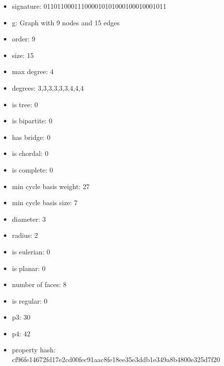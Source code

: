 \begin{figure}
\end{figure}
\begin{itemize}
\item signature: 011011000111000010101000100010001011
\item g: Graph with 9 nodes and 15 edges
\item order: 9
\item size: 15
\item max degree: 4
\item degrees: 3,3,3,3,3,3,4,4,4
\item is tree: 0
\item is bipartite: 0
\item has bridge: 0
\item is chordal: 0
\item is complete: 0
\item min cycle basis weight: 27
\item min cycle basis size: 7
\item diameter: 3
\item radius: 2
\item is eulerian: 0
\item is planar: 0
\item number of faces: 8
\item is regular: 0
\item p3: 30
\item p4: 42
\item property hash: cf96fe14672fd17e2cd00fec91aac8fe18ee35e3ddb1e349a8b4800e325d7f20
\end{itemize}
\newpage
